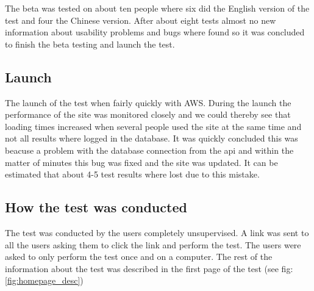 The beta was tested on about ten people where six did the English version of the test and four the Chinese version. After about eight tests almost no new information about usability problems and bugs where found so it was concluded to finish the beta testing and launch the test.

\subsection{Launch}
The launch of the test when fairly quickly with AWS. During the launch the performance of the site was monitored closely and we could thereby see that loading times increased when several people used the site at the same time and not all results where logged in the database. It was quickly concluded this was beacuse a problem with the database connection from the api and within the matter of minutes this bug was fixed and the site was updated. It can be estimated that about 4-5 test results where lost due to this mistake.

\subsection{How the test was conducted}
The test was conducted by the users completely unsupervised. A link was sent to all the users asking them to click the link and perform the test. The users were asked to only perform the test once and on a computer. The rest of the information about the test was described in the first page of the test (see fig: \ref{fig:homepage_desc})

 





